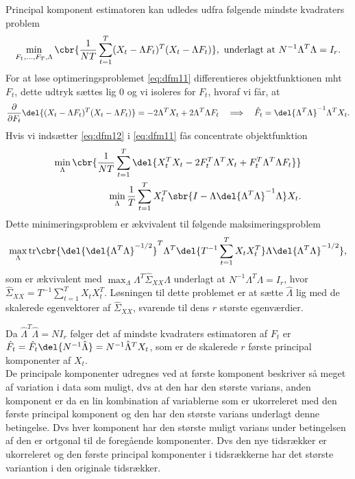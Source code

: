 Principal komponent estimatoren kan udledes udfra følgende mindste kvadraters problem
\begin{align}
\min_{F_1,\ldots,F_T, \Lambda} \cbr{\frac{1}{NT} \sum_{t=1}^T(X_t-\Lambda F_t)^T(X_t - \Lambda F_t)}, \ \text{underlagt at } N^{-1} \Lambda^T \Lambda = I_r. \label{eq:dfm11}
\end{align}
For at løse optimeringsproblemet \eqref{eq:dfm11} differentieres objektfunktionen mht \(F_t\), dette udtryk sættes lig 0 og vi isoleres for \(F_t\), hvoraf vi får, at
\begin{align}
\frac{\partial}{\partial F_t} \del{(X_t-\Lambda F_t)^T(X_t - \Lambda F_t)} = -2 \Lambda^T X_t + 2 \Lambda^T \Lambda F_t \quad \Longrightarrow \quad \hat{F}_t = \del{\Lambda^T \Lambda}^{-1} \Lambda^T X_t. \label{eq:dfm12}
\end{align}
Hvis vi indsætter \eqref{eq:dfm12} i \eqref{eq:dfm11} fås concentrate objektfunktion
\begin{align*}
\min_{\Lambda} \cbr{\frac{1}{NT} \sum_{t=1}^T \del{X_t^T X_t - 2 F_t^T \Lambda^T X_t + F_t^T \Lambda^T \Lambda F_t}} \\
\min_\Lambda \frac{1}{T} \sum_{t=1}^T X_t^T \sbr{I- \Lambda \del{\Lambda^T \Lambda}^{-1} \Lambda} X_t.
\end{align*}
Dette minimeringsproblem er ækvivalent til følgende maksimeringsproblem
\begin{align*}
\max_\Lambda \text{tr} \cbr{\del{\del{\Lambda^T \Lambda}^{-1/2}}^T \Lambda^T \del{T^{-1} \sum_{t=1}^T X_t X_t^T} \Lambda \del{\Lambda^T \Lambda}^{-1/2}},
\end{align*}
som er ækvivalent med $\max_\Lambda \Lambda^T \hat{\Sigma}_{XX} \Lambda$ underlagt at $N^{-1} \Lambda^T \Lambda=I_r$, hvor $\hat{\Sigma}_{XX}=T^{-1} \sum_{t=1}^T X_t X_t^T$.
Løsningen til dette problemet er at sætte \(\hat{\Lambda}\) lig med de skalerede egenvektorer af \(\hat{\Sigma}_{XX}\), svarende til dens \(r\) største egenværdier.

Da $\hat{\Lambda}^T \hat{\Lambda}=N I_r$ følger det af mindste kvadraters estimatoren af $F_t$ er $\hat{F}_t=\hat{F}_t \del{N^{-1}\hat{\Lambda}}=N^{-1}\hat{\Lambda}^TX_t$, som er de skalerede $r$ første principal komponenter af $X_t$. \\[4mm]
%
De principale komponenter udregnes ved at første komponent beskriver så meget af variation i data som muligt, dvs at den har den største varians, anden komponent er da en lin kombination af variablerne som er ukorreleret med den første principal komponent og den har den største varians underlagt denne betingelse.
Dvs hver komponent har den største muligt varians under betingelsen af den er ortgonal til de foregående komponenter.
Dvs den nye tidsrækker er ukorreleret og den første principal komponenter i tidsrækkerne har det største variantion i den originale tidsrækker.


